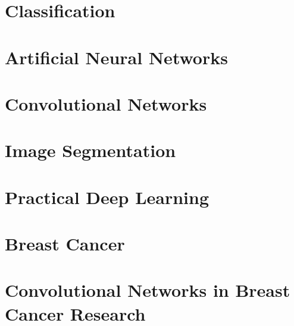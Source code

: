 \section{Classification}
\label{sec:Classification}


\section{Artificial Neural Networks}
\label{sec:ANNs}


\section{Convolutional Networks}
\label{sec:ConvNets}


\section{Image Segmentation}
\label{sec:Segmentation}
 

\section{Practical Deep Learning}
\label{sec:PracticalDL}


\section{Breast Cancer}
\label{sec:BreastCancer}


\section{Convolutional Networks in Breast Cancer Research}
\label{sec:BreastCancerConvNets}


\begin{comment}
\section{Summary}
We offered a primer into concepts needed to understand the rest of this thesis. We defined machine learning as a way to ... and how convolutional networks process image sequentially taken advanatage of image features as locality and ... to produce better results than simpler machine learning models. We ddescribe the task of segmentation as labelling each pixel in the image as belonging to an specific class from a preespecified set of classes. We highlighted the importance of mammograms for early detection of breast cancers and enlisted the two main signs appreciable in a mammogram, breast masses and microcalcifications. Finally, we reviewed all previous work in using convolutional networks for breast cancer detection and diagnosis, giving special importance to the work of ... and ... which used modern convolutional networks to od this and that.  
\end{comment}
